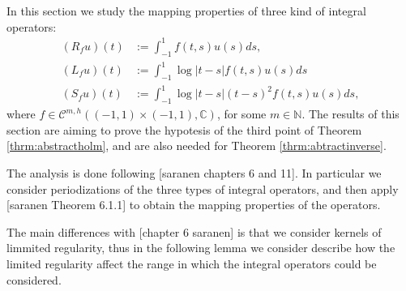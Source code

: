 \documentclass{article}
\newcommand{\todo}[1]{{\color{red}[#1]}}
\newcommand{\IC}{{\mathbb C}}
\newcommand{\IN}{{\mathbb N}}
\newcommand{\cmspaceh}[4]{\mathcal{C}^{#1,#2} \left( #3, #4 \right)}
\begin{document}
In this section we study the mapping properties of three kind of integral operators: 
\begin{align*}
(R_f u)(t) &:= \int_{-1}^1f(t,s) u(s) ds,\\
(L_fu)(t) &:= \int_{-1}^1 \log|t-s| f(t,s) u(s) ds\\
(S_f u)(t) &:= \int_{-1}^1 \log|t-s| (t-s)^2 f(t,s)u(s)ds,
\end{align*}
where $f \in \cmspaceh{m}{h}{(-1,1)\times(-1,1)}{\IC}$, for some $m \in \IN$. The results of this section are aiming to prove the hypotesis of the third point of Theorem \ref{thrm:abstractholm}, and are also needed for Theorem \ref{thrm:abtractinverse}.

The analysis is done following \todo{saranen chapters 6 and 11}. In particular we consider periodizations of the three types of integral operators, and then apply \todo{saranen Theorem 6.1.1} to obtain the mapping properties of the operators. 

The main differences with \todo{chapter 6 saranen} is that we consider kernels of limmited regularity, thus in the following lemma we consider describe how the limited regularity affect the range in which the integral operators could be considered.  
\end{document}
